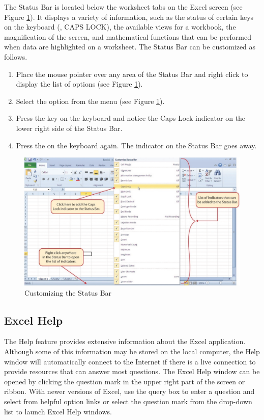 The Status Bar is located below the worksheet tabs on the Excel screen (see Figure \ref{01:fig13}). It displays a variety of information, such as the status of certain keys on the keyboard (\eg, CAPS LOCK), the available views for a workbook, the magnification of the screen, and mathematical functions that can be performed when data are highlighted on a worksheet. The Status Bar can be customized as follows.

\begin{enumerate}
	\item Place the mouse pointer over any area of the Status Bar and right click to display the  list of options (see Figure \ref{01:fig13}).
	\item Select the  option from the menu (see Figure \ref{01:fig13}).
	\item Press the  key on the keyboard and notice the Caps Lock indicator on the lower right side of the Status Bar.
	\item Press the  on the keyboard again. The indicator on the Status Bar goes away.
\end{enumerate}

\begin{figure}[H]
	\centering
	\includegraphics[width=\maxwidth{.95\linewidth}]{gfx/ch01_fig13}
	\caption{Customizing the Status Bar}
	\label{01:fig13}
\end{figure}

\subsection{Excel Help}

The Help feature provides extensive information about the Excel application. Although some of this information may be stored on the local computer, the Help window will automatically connect to the Internet if there is a live connection to provide resources that can answer most questions. The Excel Help window can be opened by clicking the question mark in the upper right part of the screen or ribbon. With newer versions of Excel, use the query box to enter a question and select from helpful option links or select the question mark from the drop-down list to launch Excel Help windows.

